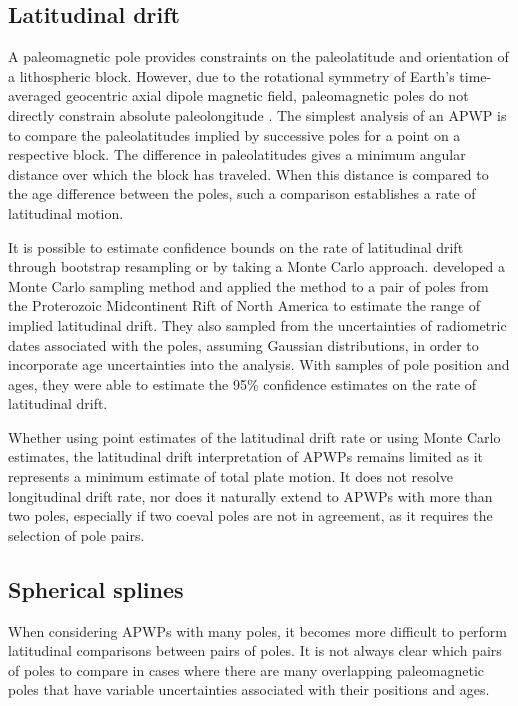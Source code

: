 \documentclass[11pt,letterpaper]{article}
\begin{document}
\subsection*{Latitudinal drift}
A paleomagnetic pole provides constraints on the paleolatitude and orientation of a lithospheric block. However, due to the rotational symmetry of Earth's time-averaged geocentric axial dipole magnetic field, paleomagnetic poles do not directly constrain absolute paleolongitude \citep{Butler1992a}. The simplest analysis of an APWP is to compare the paleolatitudes implied by successive poles for a point on a respective block. The difference in paleolatitudes gives a minimum angular distance over which the block has traveled. When this distance is compared to the age difference between the poles, such a comparison establishes a rate of latitudinal motion.

It is possible to estimate confidence bounds on the rate of latitudinal drift through bootstrap resampling \citep[e.g.][]{Tarduno1990b} or by taking a Monte Carlo approach. \cite{Swanson-Hysell2014b} developed a Monte Carlo sampling method and applied the method to a pair of poles from the Proterozoic Midcontinent Rift of North America to estimate the range of implied latitudinal drift. They also sampled from the uncertainties of radiometric dates associated with the poles, assuming Gaussian distributions, in order to incorporate age uncertainties into the analysis. With samples of pole position and ages, they were able to estimate the 95\% confidence estimates on the rate of latitudinal drift.

Whether using point estimates of the latitudinal drift rate or using Monte Carlo estimates, the latitudinal drift interpretation of APWPs remains limited as it represents a minimum estimate of total plate motion. It does not resolve longitudinal drift rate, nor does it naturally extend to APWPs with more than two poles, especially if two coeval poles are not in agreement, as it requires the selection of pole pairs.

\subsection*{Spherical splines}
When considering APWPs with many poles, it becomes more difficult to perform latitudinal comparisons between pairs of poles. It is not always clear which pairs of poles to compare in cases where there are many overlapping paleomagnetic poles that have variable uncertainties associated with their positions and ages.
\end{document}
